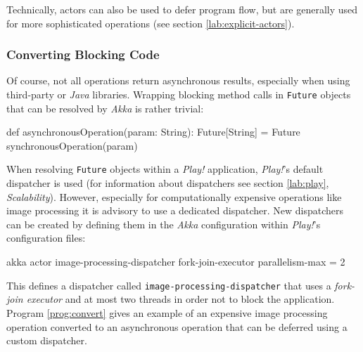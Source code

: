 Technically, actors can also be used to defer program flow, but are generally used for more sophisticated operations (see section \ref{lab:explicit-actors}).

\subsubsection*{Converting Blocking Code}
Of course, not all operations return asynchronous results, especially when using third-party or \textit{Java} libraries. Wrapping blocking method calls in \texttt{Future} objects that can be resolved by \textit{Akka} is rather trivial:
\begin{JavaCode}
def asynchronousOperation(param: String): Future[String] = {
    Future {
        synchronousOperation(param)
    }
}
\end{JavaCode}

When resolving \texttt{Future} objects within a \textit{Play!} application, \textit{Play!}'s default dispatcher is used (for information about dispatchers see section \ref{lab:play}, \textit{Scalability}). However, especially for computationally expensive operations like image processing it is advisory to use a dedicated dispatcher. New dispatchers can be created by defining them in the \textit{Akka} configuration within \textit{Play!}'s configuration files:
\begin{JavaCode}
akka {
    actor {
        image-processing-dispatcher {
            fork-join-executor {
                parallelism-max = 2
            }
        }
    }
}
\end{JavaCode}
This defines a dispatcher called \texttt{image-processing-dispatcher} that uses a \textit{fork-join executor} and at most two threads in order not to block the application. Program \ref{prog:convert} gives an example of an expensive image processing operation converted to an asynchronous operation that can be deferred using a custom dispatcher.

